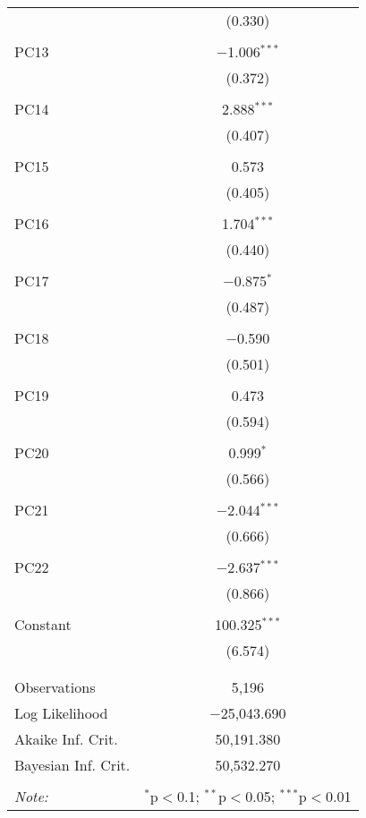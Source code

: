 \begin{table}[!htbp]
\begin{tabular}{@{\extracolsep{5pt}}lc}
  & (0.330) \\ 
  & \\ 
 PC13 & $-$1.006$^{***}$ \\ 
  & (0.372) \\ 
  & \\ 
 PC14 & 2.888$^{***}$ \\ 
  & (0.407) \\ 
  & \\ 
 PC15 & 0.573 \\ 
  & (0.405) \\ 
  & \\ 
 PC16 & 1.704$^{***}$ \\ 
  & (0.440) \\ 
  & \\ 
 PC17 & $-$0.875$^{*}$ \\ 
  & (0.487) \\ 
  & \\ 
 PC18 & $-$0.590 \\ 
  & (0.501) \\ 
  & \\ 
 PC19 & 0.473 \\ 
  & (0.594) \\ 
  & \\ 
 PC20 & 0.999$^{*}$ \\ 
  & (0.566) \\ 
  & \\ 
 PC21 & $-$2.044$^{***}$ \\ 
  & (0.666) \\ 
  & \\ 
 PC22 & $-$2.637$^{***}$ \\ 
  & (0.866) \\ 
  & \\ 
 Constant & 100.325$^{***}$ \\ 
  & (6.574) \\ 
  & \\ 
\hline \\[-1.8ex] 
Observations & 5,196 \\ 
Log Likelihood & $-$25,043.690 \\ 
Akaike Inf. Crit. & 50,191.380 \\ 
Bayesian Inf. Crit. & 50,532.270 \\ 
\hline 
\hline \\[-1.8ex] 
\textit{Note:}  & \multicolumn{1}{r}{$^{*}$p$<$0.1; $^{**}$p$<$0.05; $^{***}$p$<$0.01} \\ 
\end{tabular} 
\end{table} 
